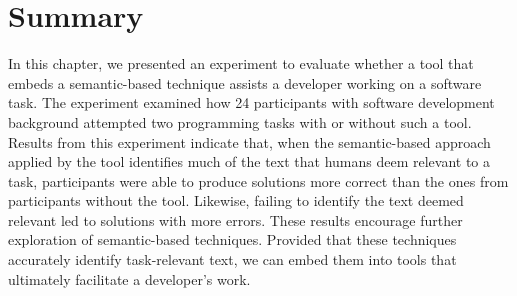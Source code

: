 \section{Summary}
\label{cp6:summary}



In this chapter, we presented an experiment to evaluate whether a tool that embeds a semantic-based technique assists a developer working on a software task. 
The experiment examined how 24 participants with software development background attempted 
two programming tasks with or without such a tool. 
Results from this experiment indicate that, when the semantic-based approach applied by the tool identifies much of the text that humans deem relevant to a task, participants were able to produce solutions more correct than the ones from participants without the tool. 
Likewise, failing to identify the text deemed relevant led to solutions with more errors. 
These results encourage further exploration of semantic-based techniques.
Provided that these techniques accurately identify task-relevant text, we can embed them into tools that ultimately facilitate a developer's work.